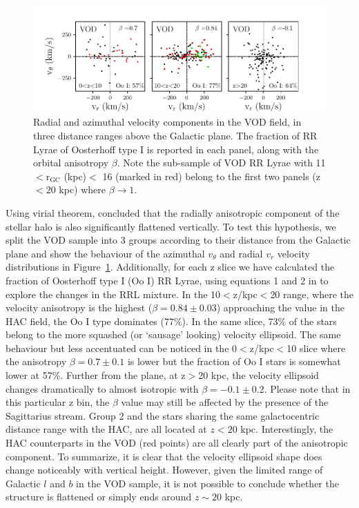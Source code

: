 \documentclass[fleqn,usenatbib]{mnras}
\begin{document}
\begin{figure}
\vspace{-0.6cm}
	\hspace{-0.3cm}
	        \includegraphics[scale=0.6]{VOD_velocities_vphi_zcuts.pdf}
\vspace{-0.4cm}
   \caption{Radial and azimuthal velocity components in the VOD field, in
     three distance ranges above the Galactic plane. The fraction of
     RR Lyrae of Oosterhoff type I is reported in each panel, along with the orbital anisotropy $\beta$. Note the sub-sample of VOD RR Lyrae with 11 $<\mathrm{r_{GC}}$ (kpc)$<$ 16 (marked in red) belong to the first two panels (z$<20$ kpc) where $\beta \rightarrow 1$. }
    \label{fig:VOD_vel}
\end{figure}
%
%
Using virial theorem, \citet{actionhalo} concluded that the radially
anisotropic component of the stellar halo is also significantly
flattened vertically. To test this hypothesis, we split the VOD sample
into 3 groups according to their distance from the Galactic plane and
show the behaviour of the azimuthal $v_{\theta}$ and radial $v_{r}$
velocity distributions in Figure~\ref{fig:VOD_vel}. Additionally, for
each z slice we have calculated the fraction of Oosterhoff type I (Oo
I) RR Lyrae, using equations 1 and 2 in \citet{Be2018} to explore the
changes in the RRL mixture. In the 10$<$z/kpc$<$20 range, where the
velocity anisotropy is the highest ($\beta = 0.84 \pm 0.03$)
approaching the value in the HAC field, the Oo I type dominates
(77\%). In the same slice, 73\% of the stars belong to the more
squashed (or `sausage' looking) velocity ellipsoid. The same behaviour
but less accentuated can be noticed in the 0$<$z/kpc$<$10 slice where
the anisotropy $\beta = 0.7 \pm 0.1$ is lower but the fraction of Oo I
stars is somewhat lower at 57\%. Further from the plane, at z$>$20
kpc, the velocity ellipsoid changes dramatically to almost isotropic
with $\beta = -0.1 \pm 0.2$. Please note that in this particular z
bin, the $\beta$ value may still be affected by the presence of the
Sagittarius stream. Group 2 and the stars sharing the same
galactocentric distance range with the HAC, are all located at $z<20$
kpc. Interestingly, the HAC counterparts in the VOD (red points) are
all clearly part of the anisotropic component. To summarize, it is
clear that the velocity ellipsoid shape does change noticeably with
vertical height. However, given the limited range of Galactic $l$ and
$b$ in the VOD sample, it is not possible to conclude whether the
structure is flattened or simply ends around $z\sim20$ kpc.
\end{document}
